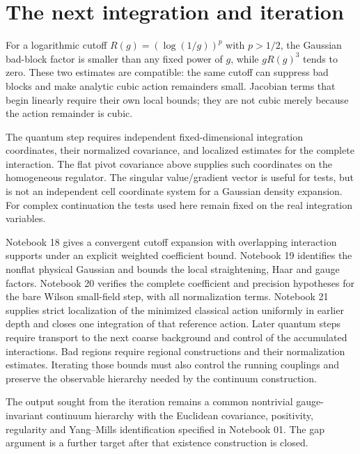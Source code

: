 \section{The next integration and iteration}
\label{gs17-next}

For a logarithmic cutoff $R(g)=(\log(1/g))^p$ with $p>1/2$,
the Gaussian bad-block factor is smaller than any fixed power of
$g$, while $gR(g)^3$ tends to zero. These two estimates are
compatible: the same cutoff can suppress bad blocks and make
analytic cubic action remainders small. Jacobian terms that begin
linearly require their own local bounds; they are not cubic merely
because the action remainder is cubic.

The quantum step requires independent fixed-dimensional integration
coordinates, their normalized covariance, and localized estimates
for the complete interaction. The flat pivot covariance above
supplies such coordinates on the homogeneous regulator. The
singular value/gradient vector is useful for tests, but is not an
independent cell coordinate system for a Gaussian density expansion.
For complex continuation the tests used here remain fixed on the
real integration variables.

Notebook 18 gives a convergent cutoff expansion with overlapping
interaction supports under an explicit weighted coefficient bound.
Notebook 19 identifies the nonflat physical Gaussian and bounds
the local straightening, Haar and gauge factors. Notebook 20
verifies the complete coefficient and precision hypotheses for
the bare Wilson small-field step, with all normalization terms.
Notebook 21 supplies strict localization of the minimized
classical action uniformly in earlier depth and closes one
integration of that reference action. Later quantum steps
require transport to the next coarse background and control
of the accumulated interactions. Bad regions require
regional constructions and their normalization estimates. Iterating
those bounds must also control the running couplings and preserve
the observable hierarchy needed by the continuum construction.

The output sought from the iteration remains a common nontrivial
gauge-invariant continuum hierarchy with the Euclidean covariance,
positivity, regularity and Yang--Mills identification specified in
Notebook 01. The gap argument is a further target after that
existence construction is closed.

